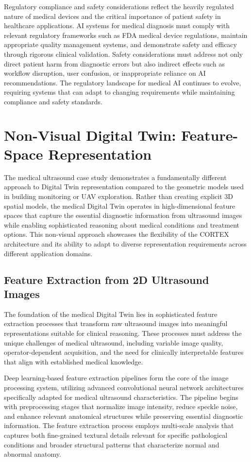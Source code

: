 Regulatory compliance and safety considerations reflect the heavily regulated nature of medical devices and the critical importance of patient safety in healthcare applications. AI systems for medical diagnosis must comply with relevant regulatory frameworks such as FDA medical device regulations, maintain appropriate quality management systems, and demonstrate safety and efficacy through rigorous clinical validation. Safety considerations must address not only direct patient harm from diagnostic errors but also indirect effects such as workflow disruption, user confusion, or inappropriate reliance on AI recommendations. The regulatory landscape for medical AI continues to evolve, requiring systems that can adapt to changing requirements while maintaining compliance and safety standards.

\section{Non-Visual Digital Twin: Feature-Space Representation}

The medical ultrasound case study demonstrates a fundamentally different approach to Digital Twin representation compared to the geometric models used in building monitoring or UAV exploration. Rather than creating explicit 3D spatial models, the medical Digital Twin operates in high-dimensional feature spaces that capture the essential diagnostic information from ultrasound images while enabling sophisticated reasoning about medical conditions and treatment options. This non-visual approach showcases the flexibility of the CORTEX architecture and its ability to adapt to diverse representation requirements across different application domains.

\subsection{Feature Extraction from 2D Ultrasound Images}

The foundation of the medical Digital Twin lies in sophisticated feature extraction processes that transform raw ultrasound images into meaningful representations suitable for clinical reasoning. These processes must address the unique challenges of medical ultrasound, including variable image quality, operator-dependent acquisition, and the need for clinically interpretable features that align with established medical knowledge.

Deep learning-based feature extraction pipelines form the core of the image processing system, utilizing advanced convolutional neural network architectures specifically adapted for medical ultrasound characteristics. The pipeline begins with preprocessing stages that normalize image intensity, reduce speckle noise, and enhance relevant anatomical structures while preserving essential diagnostic information. The feature extraction process employs multi-scale analysis that captures both fine-grained textural details relevant for specific pathological conditions and broader structural patterns that characterize normal and abnormal anatomy.

